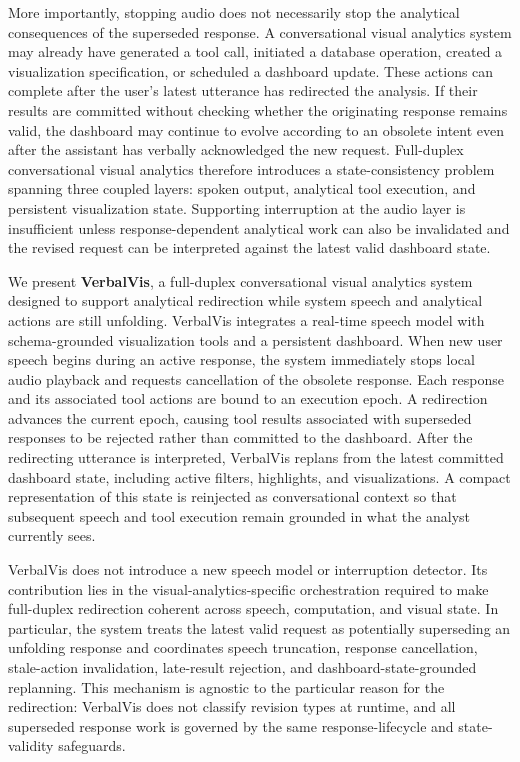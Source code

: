 \documentclass[journal]{IEEEtran}
\begin{document}
More importantly, stopping audio does not necessarily stop the analytical
consequences of the superseded response. A conversational visual analytics
system may already have generated a tool call, initiated a database operation,
created a visualization specification, or scheduled a dashboard update. These
actions can complete after the user's latest utterance has redirected the
analysis. If their results are committed without checking whether the
originating response remains valid, the dashboard may continue to evolve
according to an obsolete intent even after the assistant has verbally
acknowledged the new request. Full-duplex conversational visual analytics
therefore introduces a state-consistency problem spanning three coupled
layers: spoken output, analytical tool execution, and persistent visualization
state. Supporting interruption at the audio layer is insufficient unless
response-dependent analytical work can also be invalidated and the revised
request can be interpreted against the latest valid dashboard state.

We present \textbf{VerbalVis}, a full-duplex conversational visual analytics
system designed to support analytical redirection while system speech and
analytical actions are still unfolding. VerbalVis integrates a real-time
speech model with schema-grounded visualization tools and a persistent
dashboard. When new user speech begins during an active response, the system
immediately stops local audio playback and requests cancellation of the
obsolete response. Each response and its associated tool actions are bound to
an execution epoch. A redirection advances the current epoch, causing tool
results associated with superseded responses to be rejected rather than
committed to the dashboard. After the redirecting utterance is interpreted,
VerbalVis replans from the latest committed dashboard state, including active
filters, highlights, and visualizations. A compact representation of this
state is reinjected as conversational context so that subsequent speech and
tool execution remain grounded in what the analyst currently sees.

VerbalVis does not introduce a new speech model or interruption detector.
Its contribution lies in the visual-analytics-specific orchestration required
to make full-duplex redirection coherent across speech, computation, and
visual state. In particular, the system treats the latest valid request as
potentially superseding an unfolding response and coordinates speech
truncation, response cancellation, stale-action invalidation, late-result
rejection, and dashboard-state-grounded replanning. This mechanism is agnostic
to the particular reason for the redirection: VerbalVis does not classify
revision types at runtime, and all superseded response work is governed by the
same response-lifecycle and state-validity safeguards.
\end{document}
